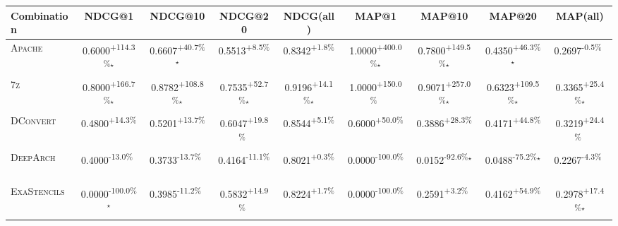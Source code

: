 \begin{table}[htbp]
\centering
\renewcommand{\arraystretch}{1.2}
\begin{tabular}{l|cccc|cccc}
\hline
Combination & NDCG@1 & NDCG@10 & NDCG@20 & NDCG(all) & MAP@1 & MAP@10 & MAP@20 & MAP(all) \\ \hline
\textsc{Apache} & \cellcolor{green!30}0.6000\textsuperscript{+114.3\%}$^\star$ & \cellcolor{green!30}0.6607\textsuperscript{+40.7\%}$^\star$ & \cellcolor{green!30}0.5513\textsuperscript{+8.5\%}$^{\,\,\,}$ & \cellcolor{green!30}0.8342\textsuperscript{+1.8\%}$^{\,\,\,}$ & \cellcolor{green!30}1.0000\textsuperscript{+400.0\%}$^\star$ & \cellcolor{green!30}0.7800\textsuperscript{+149.5\%}$^\star$ & \cellcolor{green!30}0.4350\textsuperscript{+46.3\%}$^\star$ & \cellcolor{red!30}0.2697\textsuperscript{-0.5\%}$^{\,\,\,}$ \\
\textsc{7z} & \cellcolor{green!30}0.8000\textsuperscript{+166.7\%}$^\star$ & \cellcolor{green!30}0.8782\textsuperscript{+108.8\%}$^\star$ & \cellcolor{green!30}0.7535\textsuperscript{+52.7\%}$^\star$ & \cellcolor{green!30}0.9196\textsuperscript{+14.1\%}$^\star$ & \cellcolor{green!30}1.0000\textsuperscript{+150.0\%}$^{\,\,\,}$ & \cellcolor{green!30}0.9071\textsuperscript{+257.0\%}$^\star$ & \cellcolor{green!30}0.6323\textsuperscript{+109.5\%}$^\star$ & \cellcolor{green!30}0.3365\textsuperscript{+25.4\%}$^\star$ \\
\textsc{DConvert} & \cellcolor{green!30}0.4800\textsuperscript{+14.3\%}$^{\,\,\,}$ & \cellcolor{green!30}0.5201\textsuperscript{+13.7\%}$^{\,\,\,}$ & \cellcolor{green!30}0.6047\textsuperscript{+19.8\%}$^{\,\,\,}$ & \cellcolor{green!30}0.8544\textsuperscript{+5.1\%}$^{\,\,\,}$ & \cellcolor{green!30}0.6000\textsuperscript{+50.0\%}$^{\,\,\,}$ & \cellcolor{green!30}0.3886\textsuperscript{+28.3\%}$^{\,\,\,}$ & \cellcolor{green!30}0.4171\textsuperscript{+44.8\%}$^{\,\,\,}$ & \cellcolor{green!30}0.3219\textsuperscript{+24.4\%}$^{\,\,\,}$ \\
\textsc{DeepArch} & \cellcolor{red!30}0.4000\textsuperscript{-13.0\%}$^{\,\,\,}$ & \cellcolor{red!30}0.3733\textsuperscript{-13.7\%}$^{\,\,\,}$ & \cellcolor{red!30}0.4164\textsuperscript{-11.1\%}$^{\,\,\,}$ & \cellcolor{green!30}0.8021\textsuperscript{+0.3\%}$^{\,\,\,}$ & \cellcolor{red!30}0.0000\textsuperscript{-100.0\%}$^{\,\,\,}$ & \cellcolor{red!30}0.0152\textsuperscript{-92.6\%}$^\star$ & \cellcolor{red!30}0.0488\textsuperscript{-75.2\%}$^\star$ & \cellcolor{red!30}0.2267\textsuperscript{-4.3\%}$^{\,\,\,}$ \\
\textsc{ExaStencils} & \cellcolor{red!30}0.0000\textsuperscript{-100.0\%}$^\star$ & \cellcolor{red!30}0.3985\textsuperscript{-11.2\%}$^{\,\,\,}$ & \cellcolor{green!30}0.5832\textsuperscript{+14.9\%}$^{\,\,\,}$ & \cellcolor{green!30}0.8224\textsuperscript{+1.7\%}$^{\,\,\,}$ & \cellcolor{red!30}0.0000\textsuperscript{-100.0\%}$^{\,\,\,}$ & \cellcolor{green!30}0.2591\textsuperscript{+3.2\%}$^{\,\,\,}$ & \cellcolor{green!30}0.4162\textsuperscript{+54.9\%}$^{\,\,\,}$ & \cellcolor{green!30}0.2978\textsuperscript{+17.4\%}$^\star$ \\

\end{tabular}
\end{table}
